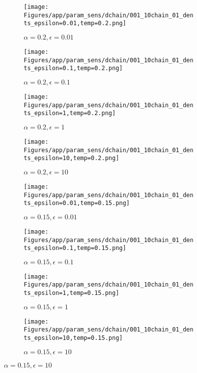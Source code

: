\documentclass{article}
\theoremstyle{plain}
\begin{document}
\begin{appendices}
\begin{figure}
                \begin{subfigure}[b]{0.24\textwidth}
                    \centering
                    \texttt{[image: Figures/app/param\_sens/dchain/001\_10chain\_01\_dents\_epsilon=0.01,temp=0.2.png]}
                    \caption*{$\alpha=0.2,\epsilon=0.01$}
                \end{subfigure}
                \begin{subfigure}[b]{0.24\textwidth}
                    \centering
                    \texttt{[image: Figures/app/param\_sens/dchain/001\_10chain\_01\_dents\_epsilon=0.1,temp=0.2.png]}
                    \caption*{$\alpha=0.2,\epsilon=0.1$}
                \end{subfigure}
                \begin{subfigure}[b]{0.24\textwidth}
                    \centering
                    \texttt{[image: Figures/app/param\_sens/dchain/001\_10chain\_01\_dents\_epsilon=1,temp=0.2.png]}
                    \caption*{$\alpha=0.2,\epsilon=1$}
                \end{subfigure}
                \begin{subfigure}[b]{0.24\textwidth}
                    \centering
                    \texttt{[image: Figures/app/param\_sens/dchain/001\_10chain\_01\_dents\_epsilon=10,temp=0.2.png]}
                    \caption*{$\alpha=0.2,\epsilon=10$}
                \end{subfigure}
                
                \begin{subfigure}[b]{0.24\textwidth}
                    \centering
                    \texttt{[image: Figures/app/param\_sens/dchain/001\_10chain\_01\_dents\_epsilon=0.01,temp=0.15.png]}
                    \caption*{$\alpha=0.15,\epsilon=0.01$}
                \end{subfigure}
                \begin{subfigure}[b]{0.24\textwidth}
                    \centering
                    \texttt{[image: Figures/app/param\_sens/dchain/001\_10chain\_01\_dents\_epsilon=0.1,temp=0.15.png]}
                    \caption*{$\alpha=0.15,\epsilon=0.1$}
                \end{subfigure}
                \begin{subfigure}[b]{0.24\textwidth}
                    \centering
                    \texttt{[image: Figures/app/param\_sens/dchain/001\_10chain\_01\_dents\_epsilon=1,temp=0.15.png]}
                    \caption*{$\alpha=0.15,\epsilon=1$}
                \end{subfigure}
                \begin{subfigure}[b]{0.24\textwidth}
                    \centering
                    \texttt{[image: Figures/app/param\_sens/dchain/001\_10chain\_01\_dents\_epsilon=10,temp=0.15.png]}
                    \caption*{$\alpha=0.15,\epsilon=10$}
                \end{subfigure}
                

\end{figure}
\end{appendices}
\end{document}

